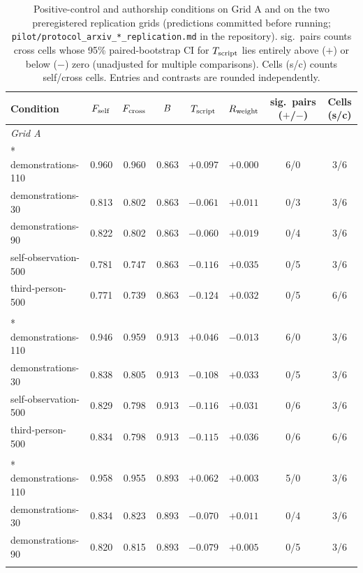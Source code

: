 \begin{table}[!t]
\centering\footnotesize\setlength{\tabcolsep}{4pt}
\begin{tabular}{lccccccc}
\toprule
Condition & $F_{\mathrm{self}}$ & $F_{\mathrm{cross}}$ & $B$ & $T_{\mathrm{script}}$ & $R_{\mathrm{weight}}$ & sig.\ pairs ($+$/$-$) & Cells (s/c) \\
\midrule
\multicolumn{8}{l}{\emph{Grid A}} \\*
demonstrations-110 & 0.960 & 0.960 & 0.863 & $+0.097$ & $+0.000$ & 6/0 & 3/6 \\
demonstrations-30 & 0.813 & 0.802 & 0.863 & $-0.061$ & $+0.011$ & 0/3 & 3/6 \\
demonstrations-90 & 0.822 & 0.802 & 0.863 & $-0.060$ & $+0.019$ & 0/4 & 3/6 \\
self-observation-500 & 0.781 & 0.747 & 0.863 & $-0.116$ & $+0.035$ & 0/5 & 3/6 \\
third-person-500 & 0.771 & 0.739 & 0.863 & $-0.124$ & $+0.032$ & 0/5 & 6/6 \\
\addlinespace
\multicolumn{8}{l}{\emph{Grid B (preregistered)}} \\*
demonstrations-110 & 0.946 & 0.959 & 0.913 & $+0.046$ & $-0.013$ & 6/0 & 3/6 \\
demonstrations-30 & 0.838 & 0.805 & 0.913 & $-0.108$ & $+0.033$ & 0/5 & 3/6 \\
self-observation-500 & 0.829 & 0.798 & 0.913 & $-0.116$ & $+0.031$ & 0/6 & 3/6 \\
third-person-500 & 0.834 & 0.798 & 0.913 & $-0.115$ & $+0.036$ & 0/6 & 6/6 \\
\addlinespace
\multicolumn{8}{l}{\emph{Local trio (preregistered)}} \\*
demonstrations-110 & 0.958 & 0.955 & 0.893 & $+0.062$ & $+0.003$ & 5/0 & 3/6 \\
demonstrations-30 & 0.834 & 0.823 & 0.893 & $-0.070$ & $+0.011$ & 0/4 & 3/6 \\
demonstrations-90 & 0.820 & 0.815 & 0.893 & $-0.079$ & $+0.005$ & 0/5 & 3/6 \\
\addlinespace
\bottomrule
\end{tabular}
\caption{Positive-control and authorship conditions on Grid A and on the two preregistered replication grids (predictions committed before running; \texttt{pilot/protocol\_arxiv\_*\_replication.md} in the repository). sig.\ pairs counts cross cells whose 95\% paired-bootstrap CI for $T_{\mathrm{script}}$ lies entirely above ($+$) or below ($-$) zero (unadjusted for multiple comparisons). Cells (s/c) counts self/cross cells. Entries and contrasts are rounded independently.}
\label{tab:replication}
\end{table}
